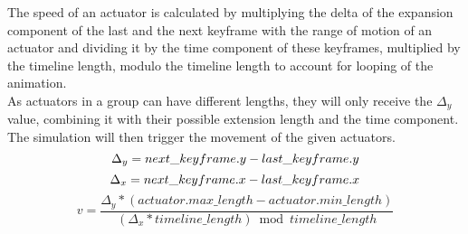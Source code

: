 The speed of an actuator is calculated by multiplying the delta of the expansion component of the last and the next keyframe with the range of motion of an actuator and dividing it by the time component of these keyframes, multiplied by the timeline length, modulo the timeline length to account for looping of the animation.\\
As actuators in a group can have different lengths, they will only receive the $\Delta_y$ value, combining it with their possible extension length and the time component. The simulation will then trigger the movement of the given actuators.
\begin{equation}
  \Delta_y = next\_keyframe.y - last\_keyframe.y\\
\end{equation}
\begin{equation}
  \Delta_x = next\_keyframe.x - last\_keyframe.x\\
\end{equation}
\begin{equation}
  v = \frac{\Delta_y * (actuator.max\_length - actuator.min\_length)}{(\Delta_x * timeline\_length) \bmod timeline\_length}
\end{equation}

